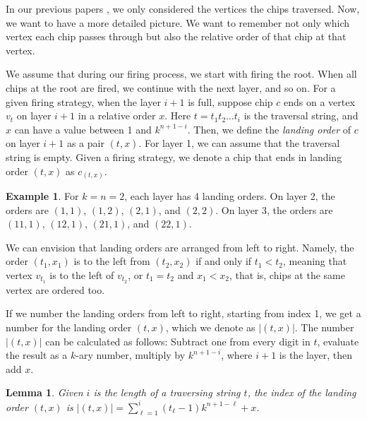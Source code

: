 \documentclass[11pt]{article}
\newtheorem{lemma}[theorem]{Lemma} %
\theoremstyle{definition}
\newtheorem{example}{Example}
\theoremstyle{remark}
\begin{document}
In our previous papers \cite{inagaki2024chipfiringundirectedbinarytrees, MR4887467, inagaki2025permutationbasedstrategieslabeledchipfiring}, we only considered the vertices the chips traversed. Now, we want to have a more detailed picture. We want to remember not only which vertex each chip passes through but also the relative order of that chip at that vertex.

We assume that during our firing process, we start with firing the root. When all chips at the root are fired, we continue with the next layer, and so on. For a given firing strategy, when the layer $i+1$ is full, suppose chip $c$ ends on a vertex $v_t$ on layer $i+1$ in a relative order $x$. Here $t=t_1t_2\dots t_i$ is the traversal string, and $x$ can have a value between 1 and $k^{n+1-i}$. Then, we define the \textit{landing order} of $c$ on layer $i+1$ as a pair $(t,x)$. For layer 1, we can assume that the traversal string is empty. Given a firing strategy, we denote a chip that ends in landing order $(t,x)$ as $c_{(t,x)}$.

\begin{example}
    For $k=n=2$, each layer has 4 landing orders. On layer 2, the orders are $(1,1)$, $(1,2)$, $(2,1)$, and $(2,2)$. On layer 3, the orders are $(11,1)$, $(12,1)$, $(21,1)$, and $(22,1)$.
\end{example}

We can envision that landing orders are arranged from left to right. Namely, the order $(t_1,x_1)$ is to the left from $(t_2,x_2)$ if and only if $t_1 < t_2$, meaning that vertex $v_{t_1}$ is to the left of $v_{t_2}$, or $t_1 = t_2$ and $x_1 < x_2$, that is, chips at the same vertex are ordered too.

If we number the landing orders from left to right, starting from index 1, we get a number for the landing order $(t,x)$, which we denote as $|(t,x)|$. The number $|(t,x)|$ can be calculated as follows: Subtract one from every digit in $t$, evaluate the result as a $k$-ary number, multiply by $k^{n+1-i}$, where $i+1$ is the layer, then add $x$. 
 
\begin{lemma}
\label{lem:landingordertonumber}
Given $i$ is the length of a traversing string $t$, the index of the landing order $(t, x)$ is $|(t, x)| = \sum_{\ell=1}^i (t_{\ell}-1)k^{n+1-\ell}+x$.
\end{lemma}
\end{document}
